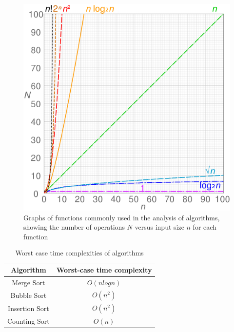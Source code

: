 \begin{figure}[H]
    \centering
    \includegraphics[width=\textwidth]{chapters/graphs/1024px-Comparison_computational_complexity.svg.png}
    \caption{Graphs of functions commonly used in the analysis of algorithms, showing the number of operations $N$ versus input size $n$ for each function}
\end{figure}

\begin{table}[h]
    \centering
    \begin{tabular}{|c|c|}
        \hline
        Algorithm & Worst-case time complexity \\
        \hline
        Merge Sort & $O(n log n)$ \\
        \hline
        Bubble Sort & $O(n^2)$ \\
        \hline
        Insertion Sort & $O(n^2)$ \\
        \hline
        Counting Sort & $O(n)$ \\
        \hline
    \end{tabular}
    \caption{Worst case time complexities of algorithms}
\end{table}
